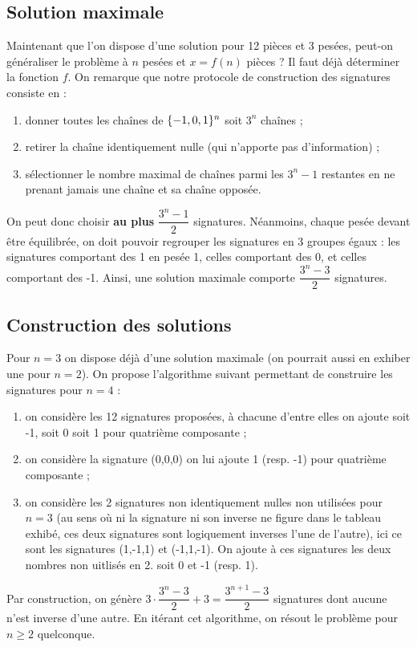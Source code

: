 \subsection{Solution maximale}

Maintenant que l'on dispose d'une solution pour 12 pièces et 3 pesées, peut-on généraliser le problème à $n$ pesées et $x=f(n)$ pièces ?
Il faut déjà déterminer la fonction $f$.
On remarque que notre protocole de construction des signatures consiste en : 
\begin{enumerate}
\item donner toutes les chaînes de $\{ -1,0,1 \}^n$ soit $3^n$ chaînes ;
\item retirer la chaîne identiquement nulle (qui n'apporte pas d'information) ;
\item sélectionner le nombre maximal de chaînes parmi les $3^n - 1$ restantes en ne prenant jamais une chaîne et sa chaîne opposée.
\end{enumerate}
On peut donc choisir \textbf{au plus} $\dfrac{3^n-1}{2}$ signatures. 
Néanmoins, chaque pesée devant être équilibrée, on doit pouvoir regrouper les signatures en 3 groupes égaux : 
les signatures comportant des 1 en pesée 1, celles comportant des 0, et celles comportant des -1.
Ainsi, une solution maximale comporte $\dfrac{3^n-3}{2}$ signatures. 

\subsection{Construction des solutions}

Pour $n=3$ on dispose déjà d'une solution maximale (on pourrait aussi en exhiber une pour $n=2$).
On propose l'algorithme suivant permettant de construire les signatures pour $n=4$ :
\begin{enumerate}
\item on considère les 12 signatures proposées, à chacune d'entre elles on ajoute soit -1, soit 0 soit 1 pour quatrième composante ;
\item on considère la signature (0,0,0) on lui ajoute 1 (resp. -1) pour quatrième composante ;
\item on considère les 2 signatures non identiquement nulles non utilisées pour $n=3$ 
(au sens où ni la signature ni son inverse ne figure dans le tableau exhibé, ces deux signatures sont logiquement inverses l'une de l'autre),
ici ce sont les signatures (1,-1,1) et (-1,1,-1). On ajoute à ces signatures les deux nombres non uitlisés en 2. soit 0 et -1 (resp. 1). 
\end{enumerate}
Par construction, on génère $3 \cdot \dfrac{3^n-3}{2} + 3 = \dfrac{3^{n+1}-3}{2}$ signatures dont aucune n'est inverse d'une autre.
En itérant cet algorithme, on résout le problème pour $n \geq 2$ quelconque.


